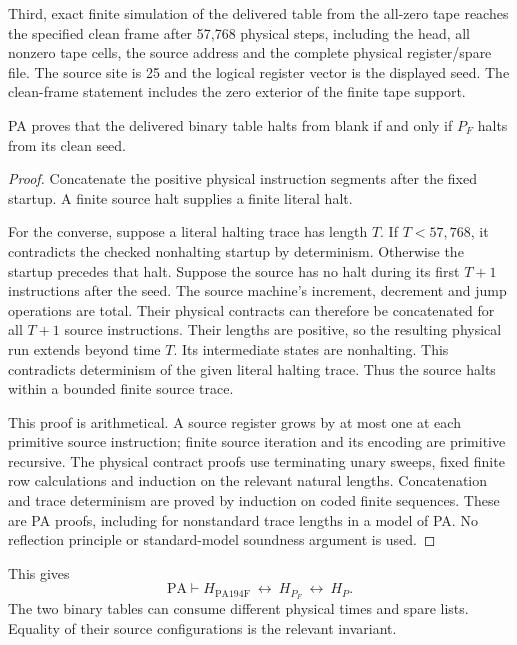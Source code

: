 Third, exact finite simulation of the delivered table from the all-zero
tape reaches the specified clean frame after 57,768 physical steps,
including the head, all nonzero tape cells, the source address and the
complete physical register/spare file. The source site is 25 and the
logical register vector is the displayed seed. The clean-frame statement
includes the zero exterior of the finite tape support.

\begin{lemma}
PA proves that the delivered binary table halts from blank if and only
if $P_F$ halts from its clean seed.
\end{lemma}
\begin{proof}
Concatenate the positive physical instruction segments after the fixed
startup. A finite source halt supplies a finite literal halt.

For the converse, suppose a literal halting trace has length $T$. If
$T<57{,}768$, it contradicts the checked nonhalting startup by
determinism. Otherwise the startup precedes that halt. Suppose the source
has no halt during its first $T+1$ instructions after the seed. The source
machine's increment, decrement and jump operations are total. Their
physical contracts can therefore be concatenated for all $T+1$ source
instructions. Their lengths are positive, so the resulting physical run
extends beyond time $T$. Its intermediate states are nonhalting. This
contradicts determinism of the given literal halting trace. Thus the
source halts within a bounded finite source trace.

This proof is arithmetical. A source register grows by at most one at each
primitive source instruction; finite source iteration and its encoding
are primitive recursive. The physical contract proofs use terminating
unary sweeps, fixed finite row calculations and induction on the relevant
natural lengths. Concatenation and trace determinism are proved by
induction on coded finite sequences. These are PA proofs, including for
nonstandard trace lengths in a model of PA. No reflection principle or
standard-model soundness argument is used.
\end{proof}

This gives
\[
 \mathrm{PA}\vdash
 H_{\mathrm{PA194F}}\ \longleftrightarrow\ H_{P_F}
                  \ \longleftrightarrow\ H_P.             \tag{F2}
\]
The two binary tables can consume different physical times and spare
lists. Equality of their source configurations is the relevant invariant.

